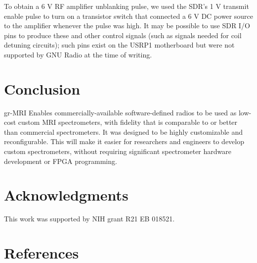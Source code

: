 \documentclass[review]{elsarticle}
\begin{document}
\par To obtain a 6 V RF amplifier unblanking pulse, 
we used the SDR's 1 V transmit enable pulse to turn on a transistor switch that connected a 6 V DC power source to the amplifier whenever the pulse was high.
It may be possible to use SDR I/O pins to produce these and other control signals (such as signals 
needed for coil detuning circuits); such pins exist on the USRP1 motherboard but 
were not supported by GNU Radio at the time of writing. 

\section{Conclusion}
gr-MRI Enables commercially-available software-defined radios
to be used as 
low-cost custom MRI spectrometers, with fidelity that is comparable to or better than
commercial spectrometers.
It was designed to be highly customizable and reconfigurable. 
This will make it easier for researchers and engineers to develop custom spectrometers, 
without requiring significant spectrometer hardware development
or FPGA programming.

\section*{Acknowledgments}

This work was supported by NIH grant R21 EB 018521.




\section*{References}

\end{document}
